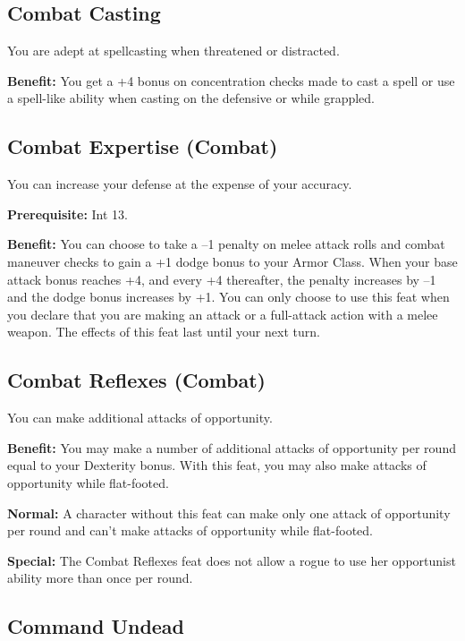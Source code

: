 \subsection{Combat Casting}

				
You are adept at spellcasting when threatened or distracted.
				
\textbf{Benefit:} You get a +4 bonus on concentration checks made to cast a spell or use a spell-like ability when casting on the defensive or while grappled.
				
\subsection{Combat Expertise (Combat)}

				
You can increase your defense at the expense of your accuracy.
				
\textbf{Prerequisite:} Int 13.
				
\textbf{Benefit:} You can choose to take a --1 penalty on melee attack rolls and combat maneuver checks to gain a +1 dodge bonus to your Armor Class. When your base attack bonus reaches +4, and every +4 thereafter, the penalty increases by --1 and the dodge bonus increases by +1. You can only choose to use this feat when you declare that you are making an attack or a full-attack action with a melee weapon. The effects of this feat last until your next turn.
				
\subsection{Combat Reflexes (Combat)}

				
You can make additional attacks of opportunity.
				
\textbf{Benefit:} You may make a number of additional attacks of opportunity per round equal to your Dexterity bonus. With this feat, you may also make attacks of opportunity while flat-footed.
				
\textbf{Normal:} A character without this feat can make only one attack of opportunity per round and can't make attacks of opportunity while flat-footed.
				
\textbf{Special:} The Combat Reflexes feat does not allow a rogue to use her opportunist ability more than once per round.
				
\subsection{Command Undead}

